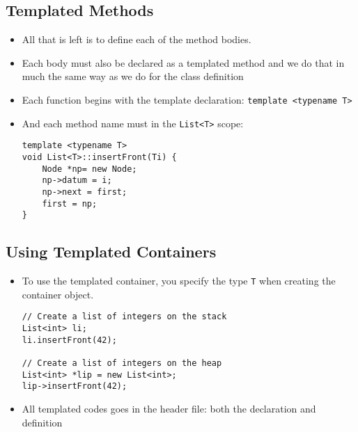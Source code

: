 \subsection{Templated Methods}
\begin{itemize}
	\item All that is left is to define each of the method bodies.
	\item Each body must also be declared as a templated method and we do that in much the same way as we do for the class definition
	\item Each function begins with the template declaration: \lstinline[style=C++]{template <typename T>}
	\item And each method name must in the \lstinline[style=C++]{List<T>} scope:
\begin{lstlisting}[style=C++]
template <typename T>
void List<T>::insertFront(Ti) {
	Node *np= new Node;
	np->datum = i;
	np->next = first;
	first = np;
}
\end{lstlisting}
\end{itemize}

\subsection{Using Templated Containers}
\begin{itemize}
	\item To use the templated container, you specify the type \lstinline[style=C++]{T} when creating the container object.
\begin{lstlisting}[style=C++]
// Create a list of integers on the stack
List<int> li;
li.insertFront(42);

// Create a list of integers on the heap
List<int> *lip = new List<int>;
lip->insertFront(42);
\end{lstlisting}
	\item All templated codes goes in the header file: both the declaration and definition
\end{itemize}

